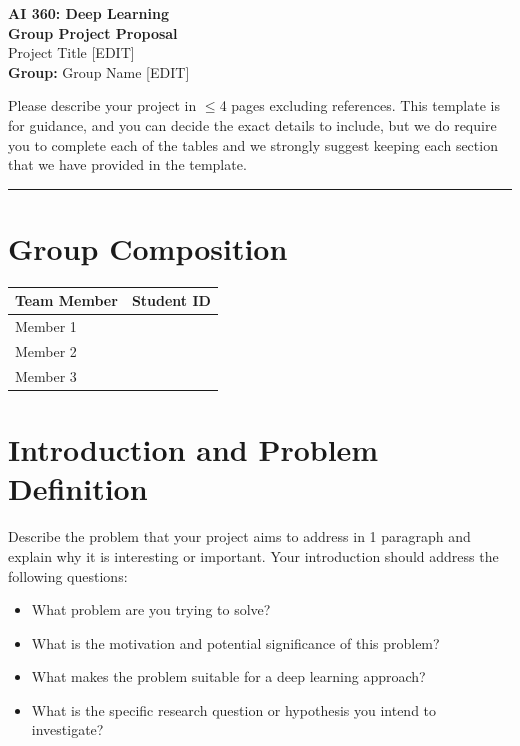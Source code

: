 \documentclass[11pt]{article}
\newcommand{\coursename}{AI 360: Deep Learning}
\newcommand{\groupname}{Group Name [EDIT]}
\newcommand{\projecttitle}{Project Title [EDIT]}
\begin{document}
\begin{center}
    {\Large \textbf{\coursename}}\\[0.4em]
    {\LARGE \textbf{Group Project Proposal}}\\[1em]
    {\large \projecttitle}\\[1em]
    \textbf{Group:} \groupname\\
\end{center}

Please describe your project in $\leq$4 pages excluding references.
This template is for guidance, and you can decide the exact details to include, but we do require you to complete each of the tables and we strongly suggest keeping each section that we have provided in the template.

\vspace{0.5em}
\hrule
\vspace{1em}

\section{Group Composition}

\begin{center}
\begin{tabularx}{\textwidth}{l l}
    \toprule
    \textbf{Team Member} &
    \textbf{Student ID} \\
    \midrule
    Member 1 & \\
    Member 2 & \\
    Member 3 & \\
    \bottomrule
\end{tabularx}
\end{center}

\section{Introduction and Problem Definition}

Describe the problem that your project aims to address in 1 paragraph and
explain why it is interesting or important. Your introduction should address the following questions:
\begin{itemize}[noitemsep]
    \item What problem are you trying to solve?
    \item What is the motivation and potential significance of this problem?
    \item What makes the problem suitable for a deep learning approach?
    \item What is the specific research question or hypothesis you intend to investigate?
\end{itemize}
\end{document}
